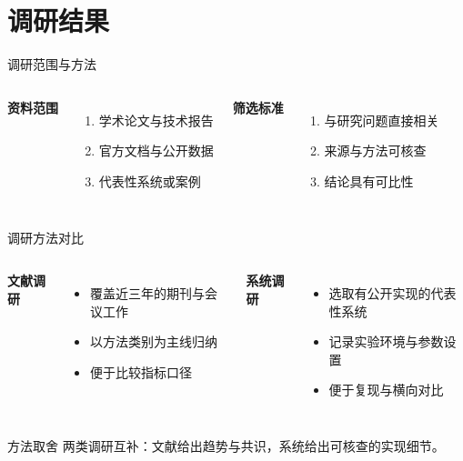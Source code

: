 \section{调研结果}

\begin{frame}{调研范围与方法}
  \begin{columns}[T,onlytextwidth]
      \textbf{资料范围}
      \begin{enumerate}
        \item 学术论文与技术报告
        \item 官方文档与公开数据
        \item 代表性系统或案例
      \end{enumerate}
      \textbf{筛选标准}
      \begin{enumerate}
        \item 与研究问题直接相关
        \item 来源与方法可核查
        \item 结论具有可比性
      \end{enumerate}
  \end{columns}
\end{frame}

\begin{frame}{调研方法对比}
  \begin{columns}[T,onlytextwidth]
      \textbf{文献调研}
      \begin{itemize}
        \item 覆盖近三年的期刊与会议工作
        \item 以方法类别为主线归纳
        \item 便于比较指标口径
      \end{itemize}
      \textbf{系统调研}
      \begin{itemize}
        \item 选取有公开实现的代表性系统
        \item 记录实验环境与参数设置
        \item 便于复现与横向对比
      \end{itemize}
  \end{columns}
  \vspace{0.4em}
  \begin{block}{方法取舍}
    两类调研互补：文献给出趋势与共识，系统给出可核查的实现细节。
  \end{block}
\end{frame}

